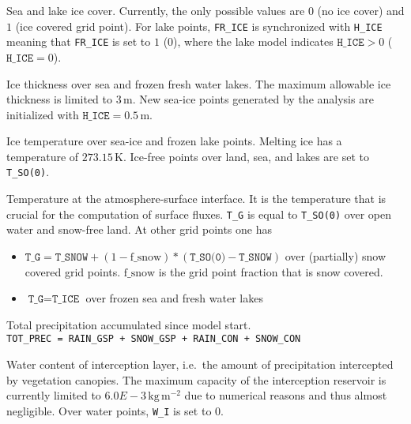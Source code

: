 \begin{description}[leftmargin=3.0cm,style=sameline]
 \item [FR\_ICE] Sea and lake ice cover. Currently, the only possible values are $0$ (no ice cover) and $1$ (ice covered grid point). For 
                 lake points, \texttt{FR\_ICE} is synchronized with \texttt{H\_ICE} meaning that \texttt{FR\_ICE} is set to $1$ ($0$), 
                 where the lake model indicates $\texttt{H\_ICE}>0$ ($\texttt{H\_ICE}=0$).

 \item [H\_ICE] Ice thickness over sea and frozen fresh water lakes. The maximum allowable ice thickness is limited to $3\,\mathrm{m}$. 
                New sea-ice points generated by the analysis are initialized with $\texttt{H\_ICE}=0.5\,\mathrm{m}$.

 \item [T\_ICE] Ice temperature over sea-ice and frozen lake points. Melting ice has a temperature of $273.15\,\mathrm{K}$. Ice-free 
                points over land, sea, and lakes are set to \texttt{T\_SO(0)}.

 \item [T\_G]   Temperature at the atmosphere-surface interface. It is the temperature that is crucial for the computation of surface fluxes. 
                \texttt{T\_G} is equal to \texttt{T\_SO(0)} over open water and snow-free land. At other grid points one has
                \begin{itemize} 
                  \item $\texttt{T\_G}=\texttt{T\_SNOW} + (1 - \mathrm{f\_snow})*(\texttt{T\_SO(0)} - \texttt{T\_SNOW})$ over (partially) 
                        snow covered grid points. $\mathrm{f\_snow}$ is the grid point fraction that is snow covered.
                  \item $\texttt{T\_G}=\texttt{T\_ICE}$ over frozen sea and fresh water lakes
                \end{itemize}

 \item [TOT\_PREC] Total precipitation accumulated since model start.\\
                \texttt{TOT\_PREC = RAIN\_GSP + SNOW\_GSP + RAIN\_CON + SNOW\_CON}
                
 \item [W\_I]   Water content of interception layer, i.e.\ the amount of precipitation intercepted by vegetation canopies. The maximum 
                capacity of the interception reservoir is currently limited to $6.0E-3\,\mathrm{kg\,m^{-2}}$ due to numerical reasons 
                and thus almost negligible. Over water points, \texttt{W\_I} is set to 0.


\end{description}
